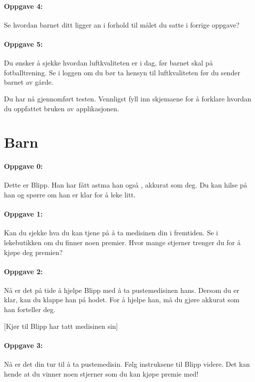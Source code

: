 \paragraph{Oppgave 4:}
Se hvordan barnet ditt ligger an i forhold til m\r{a}let du satte i forrige oppgave?


\paragraph{Oppgave 5:}
Du \o  nsker \r{a} sjekke hvordan luftkvaliteten er i dag, f\o r barnet skal p\r{a} fotballtrening. Se i loggen om du b\o r ta hensyn til luftkvaliteten f\o r du sender barnet av g\r{a}rde.  


Du har n\r{a} gjennomf\o rt testen. Vennligst fyll inn skjemaene for \r{a} forklare hvordan du oppfattet bruken av applikasjonen.

\section{Barn}

\paragraph{Oppgave 0:}
Dette er Blipp. Han har f\r{a}tt astma han ogs\r{a} , akkurat som deg. Du kan hilse p\r{a}  han og sp\o rre om han er klar for \r{a} leke litt. 

\paragraph{Oppgave 1:}
Kan du sjekke hva du kan tjene p\r{a}  \r{a}  ta medisinen din i fremtiden. Se i lekebutikken om du finner noen premier. Hvor mange stjerner trenger du for \r{a} kj\o pe deg premien?

\paragraph{Oppgave 2:}
N\r{a}  er det p\r{a}  tide \r{a}  hjelpe Blipp med \r{a}  ta pustemedisinen hans. Dersom du er klar, kan du klappe han p\r{a}  hodet. For \r{a}  hjelpe han, m\r{a}  du gj\o re akkurat som han forteller deg.  

[Kj\o r til Blipp har tatt medisinen sin]

\paragraph{Oppgave 3:}
N\r{a}  er det din tur til \r{a}  ta pustemedisin. F\o lg instruksene til Blipp videre. Det kan hende at du vinner noen stjerner som du kan kj\o pe premie med!

